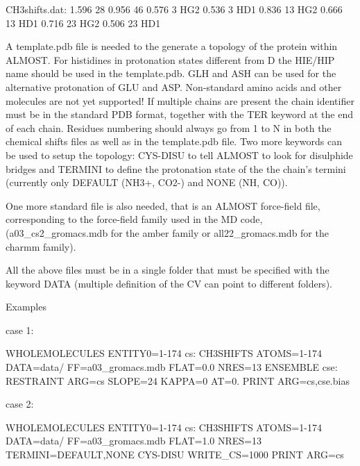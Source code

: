 \begin{DoxyVerb}CH3shifts.dat:
1.596 28
0.956 46
0.576 3 HG2
0.536 3 HD1
0.836 13 HG2
0.666 13 HD1
0.716 23 HG2
0.506 23 HD1
\end{DoxyVerb}


A template.\+pdb file is needed to the generate a topology of the protein within A\+L\+M\+O\+S\+T. For histidines in protonation states different from D the H\+I\+E/\+H\+I\+P name should be used in the template.\+pdb. G\+L\+H and A\+S\+H can be used for the alternative protonation of G\+L\+U and A\+S\+P. Non-\/standard amino acids and other molecules are not yet supported! If multiple chains are present the chain identifier must be in the standard P\+D\+B format, together with the T\+E\+R keyword at the end of each chain. Residues numbering should always go from 1 to N in both the chemical shifts files as well as in the template.\+pdb file. Two more keywords can be used to setup the topology\+: C\+Y\+S-\/\+D\+I\+S\+U to tell A\+L\+M\+O\+S\+T to look for disulphide bridges and T\+E\+R\+M\+I\+N\+I to define the protonation state of the the chain's termini (currently only D\+E\+F\+A\+U\+L\+T (N\+H3+, C\+O2-\/) and N\+O\+N\+E (N\+H, C\+O)).

One more standard file is also needed, that is an A\+L\+M\+O\+S\+T force-\/field file, corresponding to the force-\/field family used in the M\+D code, (a03\+\_\+cs2\+\_\+gromacs.\+mdb for the amber family or all22\+\_\+gromacs.\+mdb for the charmm family).

All the above files must be in a single folder that must be specified with the keyword D\+A\+T\+A (multiple definition of the C\+V can point to different folders).

\begin{DoxyParagraph}{Examples}

\end{DoxyParagraph}
case 1\+:

\begin{DoxyVerb}WHOLEMOLECULES ENTITY0=1-174
cs: CH3SHIFTS ATOMS=1-174 DATA=data/ FF=a03_gromacs.mdb FLAT=0.0 NRES=13 ENSEMBLE
cse: RESTRAINT ARG=cs SLOPE=24 KAPPA=0 AT=0.
PRINT ARG=cs,cse.bias
\end{DoxyVerb}


case 2\+:

\begin{DoxyVerb}WHOLEMOLECULES ENTITY0=1-174
cs: CH3SHIFTS ATOMS=1-174 DATA=data/ FF=a03_gromacs.mdb FLAT=1.0 NRES=13 TERMINI=DEFAULT,NONE CYS-DISU WRITE_CS=1000
PRINT ARG=cs
\end{DoxyVerb}


